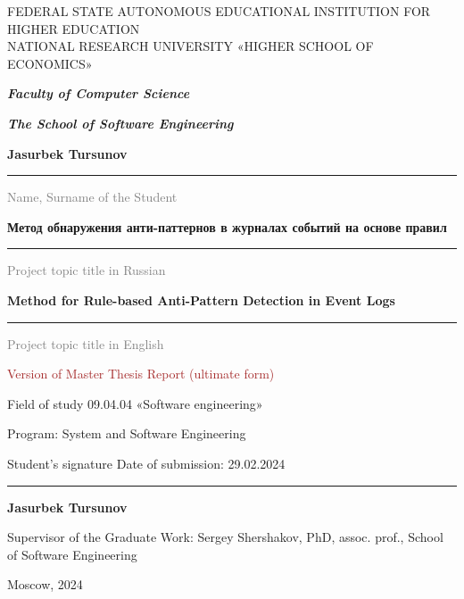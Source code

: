 \documentclass[12pt, times]{article}
\begin{document}
	\begin{center}
			\MakeUppercase{
				federal state autonomous educational institution for higher
				education\\
				national research university «higher school of economics»
			}
		
		\begin{spacing}{1}
			
		\vspace*{5mm}
		\textbf{\textit{Faculty of Computer Science}}
		
		\textbf{\textit{The School of Software Engineering}}
		\hfill
		
		\vspace*{5mm}
		\textbf{Jasurbek Tursunov}
		\vspace{4pt}
			\hrule
		\vspace{4pt}
		\textcolor{gray}{Name, Surname of the Student}

		\vspace*{5mm}
		\textbf{Метод обнаружения анти-паттернов в журналах событий на основе правил}
		\vspace{4pt}
			\hrule
		\vspace{4pt}
		\textcolor{gray}{Project topic title in Russian}	

		\vspace*{5mm}
		\textbf{Method for Rule-based Anti-Pattern Detection in Event Logs}
		\vspace{4pt}
			\hrule
		\vspace{4pt}
		\textcolor{gray}{Project topic title in English}			
		
		\vspace*{5mm}
		\textcolor{brown}{Version of Master Thesis Report (ultimate form)}
		
		Field of study 09.04.04 «Software engineering»
		
		Program: System and Software Engineering
		
		\vspace*{8mm}
		
		\begin{flushleft}
			Student’s signature	\hspace*{15mm} Date of submission: 29.02.2024
			
			\vspace*{5mm}
			
			\rule{40mm}{0.4pt}
			
			\vspace{2pt}
			\textbf{Jasurbek Tursunov}
			
			\vspace*{5mm}
			
			Supervisor of the Graduate Work: Sergey Shershakov, PhD, assoc. prof., School of Software Engineering
		\end{flushleft}
		
		Moscow, 2024
		\end{spacing}
		\thispagestyle{empty}
	\end{center}
	
\end{document}
